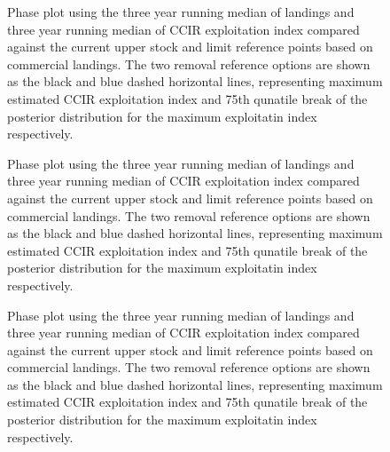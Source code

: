 \documentclass[11pt]{article}
\newcommand{\e}{/backup/bio_data/bio.lobster/figures/} %
\begin{document}
\begin{landscape}
\begin{figure}
        \centering
                    \caption{Phase plot using the three year running median of landings and three year running median of CCIR exploitation index compared against the current upper stock and limit reference points based on commercial landings. The two removal reference options are shown as the black and blue dashed horizontal lines, representing maximum estimated CCIR exploitation index and 75th qunatile break of the posterior distribution for the maximum exploitatin index respectively.}
        \end{figure}

\begin{figure}
        \centering
               
 \caption{Phase plot using the three year running median of landings and three year running median of CCIR exploitation index compared against the current upper stock and limit reference points based on commercial landings. The two removal reference options are shown as the black and blue dashed horizontal lines, representing maximum estimated CCIR exploitation index and 75th qunatile break of the posterior distribution for the maximum exploitatin index respectively.}
        
        \end{figure}

\begin{figure}
        \centering
                    \caption{Phase plot using the three year running median of landings and three year running median of CCIR exploitation index compared against the current upper stock and limit reference points based on commercial landings. The two removal reference options are shown as the black and blue dashed horizontal lines, representing maximum estimated CCIR exploitation index and 75th qunatile break of the posterior distribution for the maximum exploitatin index respectively.}
        
        \end{figure}

\end{landscape}
\end{document}
